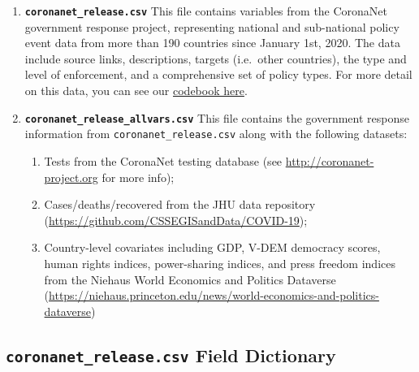 \documentclass[]{article}
\providecommand{\tightlist}{%
  \setlength{\itemsep}{0pt}\setlength{\parskip}{0pt}}
\begin{document}
\begin{enumerate}
\def\labelenumi{\arabic{enumi}.}
\item
  \textbf{\texttt{coronanet\_release.csv}} This file contains variables from the CoronaNet government response project, representing national and sub-national policy event data from more than 190 countries since January 1st, 2020. The data include source links, descriptions, targets (i.e.~other countries), the type and level of enforcement, and a comprehensive set of policy types. For more detail on this data, you can see our \href{https://docs.google.com/document/d/1zvNMpwj0onFvUZ_gLl4RRjqS-clbHv3TIX6EOHofsME}{codebook here}.
\item
  \textbf{\texttt{coronanet\_release\_allvars.csv}} This file contains the government response information from \texttt{coronanet\_release.csv} along with the following datasets:

  \begin{enumerate}
  \def\labelenumii{\alph{enumii}.}
  \tightlist
  \item
    Tests from the CoronaNet testing database (see \url{http://coronanet-project.org} for more info);
  \item
    Cases/deaths/recovered from the JHU data repository (\url{https://github.com/CSSEGISandData/COVID-19});
  \item
    Country-level covariates including GDP, V-DEM democracy scores, human rights indices, power-sharing indices, and press freedom indices from the Niehaus World Economics and Politics Dataverse (\url{https://niehaus.princeton.edu/news/world-economics-and-politics-dataverse})
  \end{enumerate}
\end{enumerate}

\hypertarget{coronanet_release.csv-field-dictionary}{%
\subsection*{\texorpdfstring{\texttt{coronanet\_release.csv} Field Dictionary}{coronanet\_release.csv Field Dictionary}}\label{coronanet_release.csv-field-dictionary}}
\end{document}
